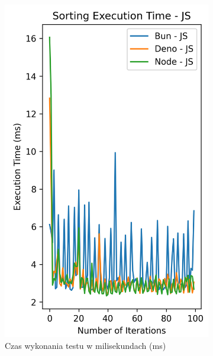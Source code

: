 \begin{figure}[H]
  \centering
  \begin{subfigure}[b]{0.42\textwidth}
    \centering
    \includegraphics[width=\textwidth]{Figures/sorting/sorting_quick_100_10000_js_time.png}
    \caption{Czas wykonania testu w milisekundach (ms)}
    \label{fig:quick_sorting_e3_time}
  \end{subfigure}
  \begin{subfigure}[b]{0.42\textwidth}
    \centering

\end{subfigure}
\end{figure}
